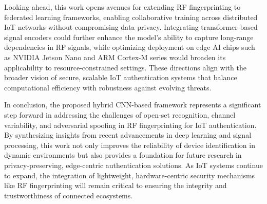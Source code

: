 \documentclass[conference]{IEEEtran}
\begin{document}
Looking ahead, this work opens avenues for extending RF fingerprinting to federated learning frameworks, enabling collaborative training across distributed IoT networks without compromising data privacy. Integrating transformer-based signal encoders could further enhance the model's ability to capture long-range dependencies in RF signals, while optimizing deployment on edge AI chips such as NVIDIA Jetson Nano and ARM Cortex-M series would broaden its applicability to resource-constrained settings. These directions align with the broader vision of secure, scalable IoT authentication systems that balance computational efficiency with robustness against evolving threats.  

In conclusion, the proposed hybrid CNN-based framework represents a significant step forward in addressing the challenges of open-set recognition, channel variability, and adversarial spoofing in RF fingerprinting for IoT authentication. By synthesizing insights from recent advancements in deep learning and signal processing, this work not only improves the reliability of device identification in dynamic environments but also provides a foundation for future research in privacy-preserving, edge-centric authentication solutions. As IoT systems continue to expand, the integration of lightweight, hardware-centric security mechanisms like RF fingerprinting will remain critical to ensuring the integrity and trustworthiness of connected ecosystems.
\end{document}
